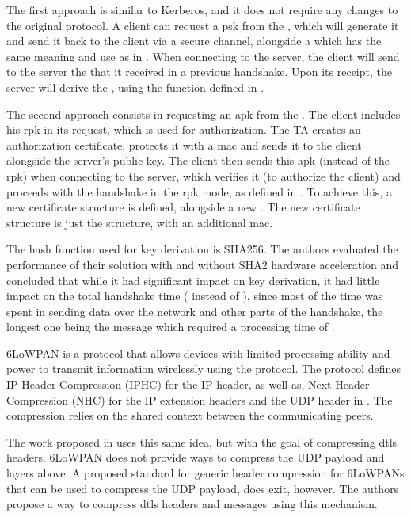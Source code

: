 \documentclass{llncs}
\begin{document}
The first approach is similar to Kerberos\cite{RFC4120}, and it does not require any
changes to the original protocol. A client can request a \gls{psk}  from the ,
which will generate it and send it back to the client via a secure channel, alongside
a  which has the same meaning and use as in \cite{RFC4279}. When connecting to the server,
the client will send to the server the  that it received in a previous
handshake. Upon its receipt, the server will derive the , using the
 function defined in \cite{RFC5246}.

The second approach consists in requesting an \gls{apk}
from the . The client includes his \gls{rpk} in its request, which is used for authorization. The TA
creates an authorization certificate, protects it with a \gls{mac} and sends it
to the client alongside the server's public key.
The client then sends this \gls{apk} (instead of the \gls{rpk})
when connecting to the server, which verifies it (to authorize the client)
and proceeds with the handshake in the \gls{rpk} mode, as defined in  \cite{RFC4279}.
To achieve this, a new certificate structure is defined, alongside a new .
The new certificate structure is just the  \cite{RFC7250} structure, with an
additional \gls{mac}.

The hash function used for key derivation is SHA256. The authors evaluated the
performance of their solution with and without SHA2 hardware acceleration and
concluded that while it had significant impact on key derivation, it had little
impact on the total handshake time ( instead of ), since most of the time was spent in sending
data over the network and other parts of the handshake, the longest one being
the  message which required a processing time
of .

6LoWPAN\cite{RFC4944} is a protocol that allows devices with limited processing
ability and power to transmit information wirelessly using the 
protocol. The protocol defines IP Header Compression (IPHC) for the IP header, as well as,
Next Header Compression (NHC) for the IP extension headers and the UDP header in \cite{RFC6282}.
The compression relies on the shared context between the communicating peers.

The work proposed in \cite{6LoWPANC53:online} uses this same idea, but with the goal of compressing \gls{dtls} headers.
6LoWPAN does not provide ways to compress the UDP payload and layers above.
A proposed standard\cite{RFC7400} for generic header compression
for 6LoWPANs that can be used to compress the UDP payload, does exit, however. The authors propose
a way to compress \gls{dtls} headers and messages using this mechanism.
\end{document}
